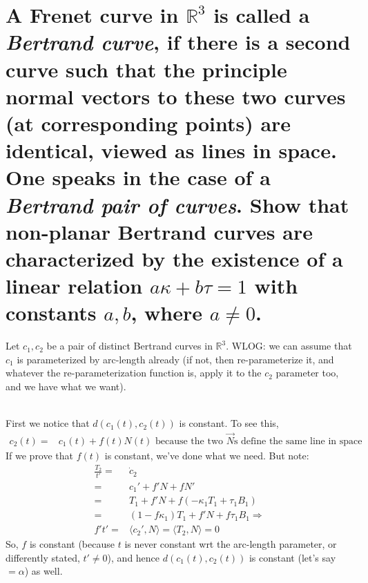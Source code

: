 \documentclass[12pt]{amsart}
\begin{document}
\section{A Frenet curve in $\mathbb{R}^3$ is called a \emph{Bertrand curve}, if there is a second curve such that the principle normal vectors to these two curves (at corresponding points) are identical, viewed as lines in space. One speaks in the case of a \emph{Bertrand pair of curves}. Show that non-planar Bertrand curves are characterized by the existence of a linear relation $a\kappa+b\tau=1$ with constants $a,b$, where $a\neq0$.}
Let $c_1,c_2$ be a pair of distinct Bertrand curves in $\mathbb{R}^3$. WLOG: we can assume that $c_1$ is parameterized by arc-length already (if not, then re-parameterize it, and whatever the re-parameterization function is, apply it to the $c_2$ parameter too, and we have what we want).
\begin{comment} and let $N_1,N_2$ be their corresponding Principal Normal vectors at $t$. Then $\forall t\in I,$ $N_1=N_2$. Hence, $\forall t\in I$, $\dot N_1=\dot N_2$ (so we can drop the subscripts on $N$ and $\dot N$). Now, $\frac{\ddot c_1}{\kappa_1}=N=\frac{\ddot c_2}{\kappa_2}$. Since the $N$ vectors are identical at every point, then $\frac{dN}{dt}$ must have the same property. Hence, if we let $s_1,s_2$ be the arc-length parameters then $(-\kappa_1T_1+\tau_1B_1)\frac{ds_1}{dt}=(-\kappa_2T_2+\tau_2B_2)\frac{ds_2}{dt}$.
\\Let $r$ be a Bertrand curve in $\mathbb{R}^3$, and let $c$ be its Bertrand pair. Furthermore, WLOG: let's assume that $r$ is already parameterized by arc-length.
\end{comment}
\\First we notice that $d(c_1(t),c_2(t))$ is constant. To see this,
\begin{align*}
	c_2(t)=&c_1(t)+f(t)N(t) \text{ because the two $\vec N$s define the same line in space}
\end{align*}
If we prove that $f(t)$ is constant, we've done what we need. But note:
\begin{align*}
	\frac{T_2}{t'}=&\dot c_2
	\\=&c_1'+f'N+fN'
	\\=&T_1+f'N+f(-\kappa_1T_1+\tau_1B_1)
	\\=&(1-f\kappa_1)T_1+f'N+f\tau_1B_1 \Rightarrow
	\\f't'=&\langle c_2',N\rangle=\langle T_2,N\rangle=0
\end{align*}
So, $f$ is constant (because $t$ is never constant wrt the arc-length parameter, or differently stated, $t'\neq0$), and hence $d(c_1(t),c_2(t))$ is constant (let's say $=\alpha$) as well.
\end{document}

